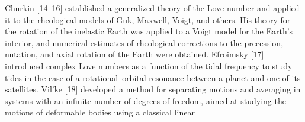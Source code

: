 \documentclass[12pt]{article}
\begin{document}
\begin{multicols}{2}
Churkin [14–16] established a generalized theory of
the Love number and applied it to the rheological
models of Guk, Maxwell, Voigt, and others. His
theory for the rotation of the inelastic Earth was applied
to a Voigt model for the Earth’s interior, and
numerical estimates of rheological corrections to the
precession, nutation, and axial rotation of the Earth
were obtained. Efroimsky [17] introduced complex
Love numbers as a function of the tidal frequency to
study tides in the case of a rotational–orbital resonance
between a planet and one of its satellites.
Vil’ke [18] developed a method for separating motions
and averaging in systems with an infinite number
of degrees of freedom, aimed at studying the
motions of deformable bodies using a classical linear
\end{multicols}
\end{document}
